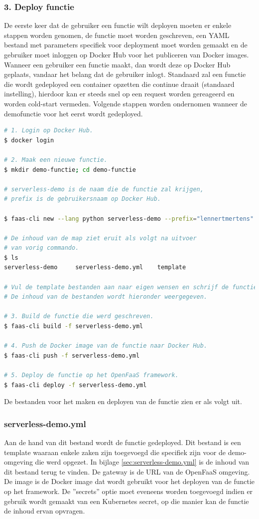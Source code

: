 \subsubsection{3. Deploy functie}
De eerste keer dat de gebruiker een functie wilt deployen moeten er enkele stappen worden genomen, de functie moet worden geschreven, een YAML bestand met parameters specifiek voor deployment moet worden gemaakt en de gebruiker moet inloggen op Docker Hub voor het publiceren van Docker images. Wanneer een gebruiker een functie maakt, dan wordt deze op Docker Hub geplaats, vandaar het belang dat de gebruiker inlogt. Standaard zal een functie die wordt gedeployed een container opzetten die continue draait (standaard instelling), hierdoor kan er steeds snel op een request worden gereageerd en worden cold-start vermeden. Volgende stappen worden ondernomen wanneer de demofunctie voor het eerst wordt gedeployed.

\begin{lstlisting}[language=bash]
# 1. Login op Docker Hub.
$ docker login

# 2. Maak een nieuwe functie.
$ mkdir demo-functie; cd demo-functie

# serverless-demo is de naam die de functie zal krijgen,
# prefix is de gebruikersnaam op Docker Hub.

$ faas-cli new --lang python serverless-demo --prefix="lennertmertens"

# De inhoud van de map ziet eruit als volgt na uitvoer 
# van vorig commando.
$ ls
serverless-demo     serverless-demo.yml    template

# Vul de template bestanden aan naar eigen wensen en schrijf de functie
# De inhoud van de bestanden wordt hieronder weergegeven.

# 3. Build de functie die werd geschreven.
$ faas-cli build -f serverless-demo.yml

# 4. Push de Docker image van de functie naar Docker Hub.
$ faas-cli push -f serverless-demo.yml

# 5. Deploy de functie op het OpenFaaS framework.
$ faas-cli deploy -f serverless-demo.yml
\end{lstlisting}

De bestanden voor het maken en deployen van de functie zien er als volgt uit.

\subsubsection{serverless-demo.yml}
Aan de hand van dit bestand wordt de functie gedeployed. Dit bestand is een template waaraan enkele zaken zijn toegevoegd die specifiek zijn voor de demo-omgeving die werd opgezet. In bijlage \ref{sec:serverless-demo.yml} is de inhoud van dit bestand terug te vinden. De gateway is de URL van de OpenFaaS omgeving. De image is de Docker image dat wordt gebruikt voor het deployen van de functie op het framework. De ''secrets'' optie moet eveneens worden toegevoegd indien er gebruik wordt gemaakt van een Kubernetes secret, op die manier kan de functie de inhoud ervan opvragen.

